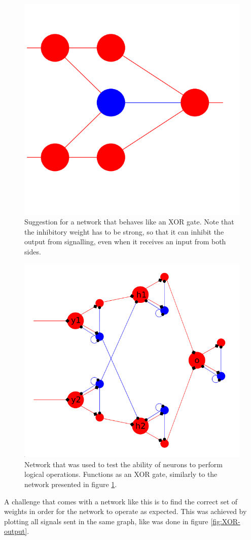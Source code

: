\documentclass[a4paper,twocolumn]{article}
\begin{document}
\begin{figure}
    \centering
    \includegraphics[width=.5\textwidth]{figures/XOR-suggestion.png}
    \caption{Suggestion for a network that behaves like an XOR gate. Note that
        the inhibitory weight has to be strong, so that it can inhibit the output
        from signalling, even when it receives an input from both sides.}
    \label{fig:XOR-suggested}
\end{figure}

\begin{figure}
    \centering
    \includegraphics[width=.5\textwidth]{figures/XOR-used.png}
    \caption{Network that was used to test the ability of neurons to perform
        logical operations. Functions as an XOR gate, similarly to the network
        presented in figure \ref{fig:XOR-suggested}.}
    \label{fig:XOR-used}
\end{figure}

A challenge that comes with a network like this is to find the correct set of
weights in order for the network to operate as expected. This was achieved by
plotting all signals sent in the same graph, like was done in figure
\ref{fig:XOR-output}.
\end{document}
